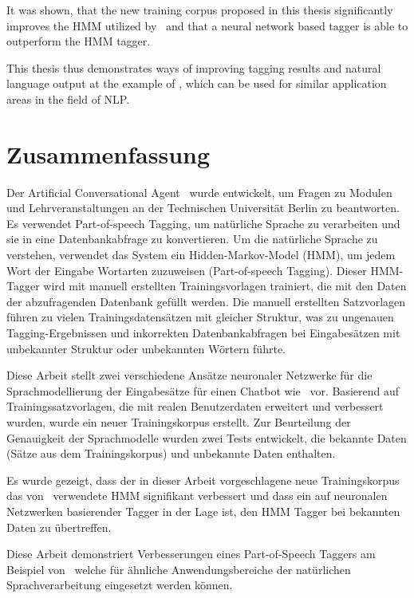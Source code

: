 It was shown, that the new training corpus proposed in this thesis significantly improves the HMM utilized by \Alex\ and that a neural network based tagger is able to outperform the HMM tagger.

This thesis thus demonstrates ways of improving tagging results and natural language output at the example of \Alex, which can be used for similar application areas in the field of NLP.

\BlankPage

\chapter*{Zusammenfassung}
Der Artificial Conversational Agent \Alex\ wurde entwickelt, um Fragen zu Modulen und Lehrveranstaltungen an der Technischen Universität Berlin zu beantworten. Es verwendet Part-of-speech Tagging, um natürliche Sprache zu verarbeiten und sie in eine Datenbankabfrage zu konvertieren. Um die natürliche Sprache zu verstehen, verwendet das System ein Hidden-Markov-Model (HMM), um jedem Wort der Eingabe Wortarten zuzuweisen (Part-of-speech Tagging). Dieser HMM-Tagger wird mit manuell erstellten Trainingsvorlagen trainiert, die mit den Daten der abzufragenden Datenbank gefüllt werden. Die manuell erstellten Satzvorlagen führen zu vielen Trainingsdatensätzen mit gleicher Struktur, was zu ungenauen Tagging-Ergebnissen und inkorrekten Datenbankabfragen bei Eingabesätzen mit unbekannter Struktur oder unbekannten Wörtern führte.

Diese Arbeit stellt zwei verschiedene Ansätze neuronaler Netzwerke für die Sprachmodellierung der Eingabesätze für einen Chatbot wie \Alex\ vor. Basierend auf Trainingssatzvorlagen, die mit realen Benutzerdaten erweitert und verbessert wurden, wurde ein neuer Trainingskorpus erstellt. Zur Beurteilung der Genauigkeit der Sprachmodelle wurden zwei Tests entwickelt, die bekannte Daten (Sätze aus dem Trainingskorpus) und unbekannte Daten enthalten.

Es wurde gezeigt, dass der in dieser Arbeit vorgeschlagene neue Trainingskorpus das von \Alex\ verwendete HMM signifikant verbessert und dass ein auf neuronalen Netzwerken basierender Tagger in der Lage ist, den HMM Tagger bei bekannten Daten zu übertreffen.

Diese Arbeit demonstriert Verbesserungen eines Part-of-Speech Taggers am Beispiel von \Alex\, welche für ähnliche Anwendungsbereiche der natürlichen Sprachverarbeitung eingesetzt werden können.

